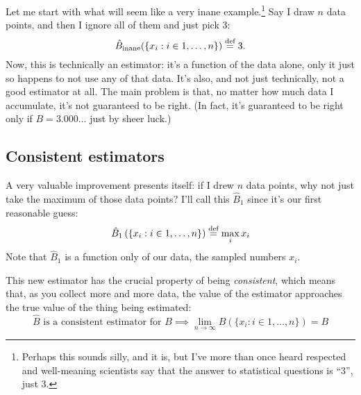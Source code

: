 Let me start with what will seem like a very inane example.\footnote{Perhaps
this sounds silly, and it is, but I've more than once heard respected and
well-meaning scientists say that the answer to statistical questions is ``3'',
just 3.}  Say I draw $n$ data points, and then I ignore all of them and just
pick 3:
\begin{equation}
\hat{B}_\mathrm{inane}(\{x_i : i \in 1, \ldots, n \}) \stackrel{\text{def}}{=} 3.
\end{equation}
Now, this is technically an estimator: it's a function of the
data alone, only it just so happens to not use any of that data. It's also,
and not just technically, not a good estimator at all. The main problem is
that, no matter how much data I accumulate, it's not guaranteed to be right.
(In fact, it's guaranteed to be right only if $B=3.000\ldots$ just by sheer luck.)

\subsection{Consistent estimators}

A very valuable improvement presents itself: if I drew $n$ data points, why not
just take the maximum of those data points? I'll call this $\hat{B}_1$ since
it's our first reasonable guess:
\begin{equation}
\hat{B}_1\left( \{x_i : i \in 1, \ldots, n\} \right) \stackrel{\text{def}}{=} \max_i x_i
\end{equation}
Note that $\hat{B}_1$ is a function only of our data, the sampled numbers $x_i$.

This new estimator has the crucial property of being \emph{consistent}, which
means that, as you collect more and more data, the value of the estimator
approaches the true value of the thing being estimated:
\begin{equation}
\text{$\hat{B}$ is a consistent estimator for $B$}
  \implies \lim_{n\to\infty} \hat{B}(\{x_i : i \in 1,\ldots,n\}) = B
\end{equation}

